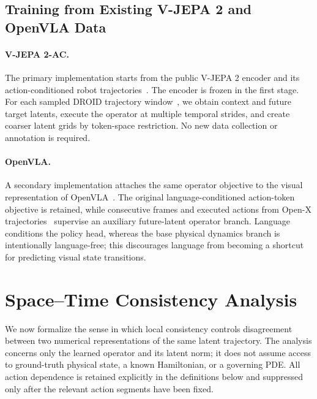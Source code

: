 \documentclass{article}
\theoremstyle{plain}
\theoremstyle{definition}
\theoremstyle{remark}
\begin{document}
\subsection{Training from Existing V-JEPA 2 and OpenVLA Data}
\paragraph{V-JEPA 2-AC.}
The primary implementation starts from the public V-JEPA 2 encoder and its action-conditioned robot trajectories~\citep{assran2025vjepa2}. The encoder is frozen in the first stage. For each sampled DROID trajectory window~\citep{khazatsky2024droid}, we obtain context and future target latents, execute the operator at multiple temporal strides, and create coarser latent grids by token-space restriction. No new data collection or annotation is required.

\paragraph{OpenVLA.}
A secondary implementation attaches the same operator objective to the visual representation of OpenVLA~\citep{kim2024openvla}. The original language-conditioned action-token objective is retained, while consecutive frames and executed actions from Open-X trajectories~\citep{oneill2023openx} supervise an auxiliary future-latent operator branch. Language conditions the policy head, whereas the base physical dynamics branch is intentionally language-free; this discourages language from becoming a shortcut for predicting visual state transitions.

\section{Space--Time Consistency Analysis}
\label{sec:theory}

We now formalize the sense in which local consistency controls disagreement between two numerical representations of the same latent trajectory. The analysis concerns only the learned operator and its latent norm; it does not assume access to ground-truth physical state, a known Hamiltonian, or a governing PDE. All action dependence is retained explicitly in the definitions below and suppressed only after the relevant action segments have been fixed.
\end{document}
